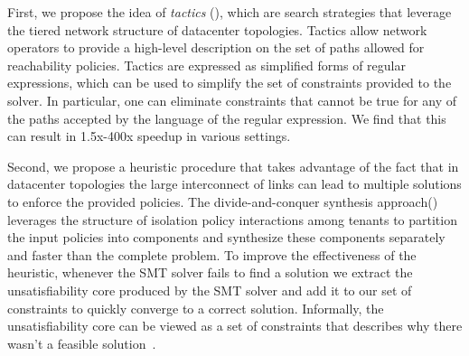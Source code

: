 First, we propose the idea of \emph{tactics} (),
which are search strategies that leverage the tiered network structure
of datacenter topologies.
Tactics allow network operators to provide a high-level description on
the set of paths allowed for reachability policies.  Tactics are
expressed as simplified forms of regular expressions, which can be
used to simplify the set of constraints provided to the solver.  In
particular, one can eliminate constraints that cannot be true for any
of the paths accepted by the language of the regular expression. We
find that this can result in 1.5x-400x speedup in various settings.

Second, we propose a heuristic procedure that takes advantage of the fact that in 
datacenter topologies the large
interconnect of links can lead to multiple solutions 
to enforce the provided policies.  
The divide-and-conquer
synthesis approach() leverages the structure of
isolation policy interactions among tenants to partition the input
policies into components and synthesize these components separately and
faster than the complete problem. To improve the effectiveness of the
heuristic, whenever the SMT solver fails to find a solution we extract
the unsatisfiability core produced by the SMT solver and 
add it to our set of constraints to quickly converge to a correct solution.
Informally, the unsatisfiability core can be viewed
as a set of constraints that describes why there wasn't a feasible solution~\cite{unsatcores}.

